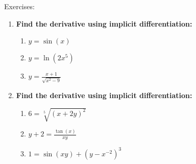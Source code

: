\documentclass[../revisedMain.tex]{subfiles}
\begin{document}
	\begin{center}
		{\Large Exercises:}
	\end{center}
	\begin{enumerate}
		\item\textbf{Find the derivative using implicit differentiation:}
		\begin{enumerate}
			\item $y=\sin(x)$
			\item $y=\ln(2x^5)$
			\item $y=\displaystyle\frac{x+1}{\sqrt{x^2-9}}$
		\end{enumerate}
		\item\textbf{Find the derivative using implicit differentiation:}
		\begin{enumerate}
			\item $6=\sqrt[5]{(x+2y)^2}$
			\item $y+2=\displaystyle\frac{\tan(x)}{xy}$
			\item $1=\sin(xy)+(y-x^{-2})^3$
		\end{enumerate}
	\end{enumerate}
\end{document}
